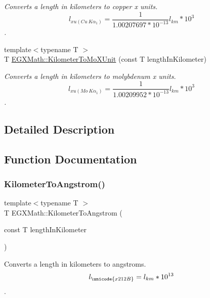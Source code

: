 \begin{DoxyCompactItemize}
\begin{DoxyCompactList}\small\item\em Converts a length in kilometers to copper x units. \[ l_{xu(Cu\ K\alpha_1)}= \frac{1}{1.00207697*10^{-13}} l_{km} * 10^{3}\]. \end{DoxyCompactList}\item 
{\footnotesize template$<$typename T $>$ }\\T \mbox{\hyperlink{group___e_g_x_math-_conversions-_length_conversions-_s_i-_kilometer-_non-_s_i_ga547782594ebd0cc3e565f6d32f9528df}{E\+G\+X\+Math\+::\+Kilometer\+To\+Mo\+X\+Unit}} (const T length\+In\+Kilometer)
\begin{DoxyCompactList}\small\item\em Converts a length in kilometers to molybdenum x units. \[ l_{xu(Mo\ K\alpha_1)}=\frac{1}{1.00209952*10^{-13}} l_{km} * 10^{3}\]. \end{DoxyCompactList}\end{DoxyCompactItemize}


\subsection{Detailed Description}


\subsection{Function Documentation}
\mbox{\label{group___e_g_x_math-_conversions-_length_conversions-_s_i-_kilometer-_non-_s_i_ga415a412a1b03916d6071a206a3318035}} 
\subsubsection{\texorpdfstring{Kilometer\+To\+Angstrom()}{KilometerToAngstrom()}}
{\footnotesize\ttfamily template$<$typename T $>$ \\
T E\+G\+X\+Math\+::\+Kilometer\+To\+Angstrom (\begin{DoxyParamCaption}\item[{const T}]{length\+In\+Kilometer }\end{DoxyParamCaption})}



Converts a length in kilometers to angstroms. \[ l_{\unicode{x212B}}=l_{km} * 10^{13} \]. 

